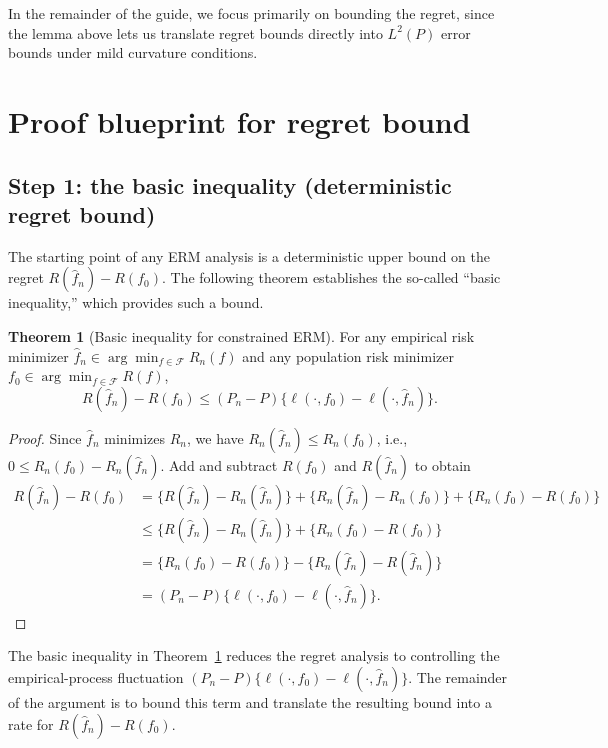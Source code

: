 \documentclass[11pt]{article}
\theoremstyle{plain}
\theoremstyle{definition} %
\newtheorem{theorem}{Theorem}
\begin{document}
In the remainder of the guide, we focus primarily on bounding the regret, since the lemma above lets us translate regret bounds directly into \(L^2(P)\) error bounds under mild curvature conditions.


\section{Proof blueprint for regret bound}

\label{sec:overview}





\subsection{Step 1: the basic inequality (deterministic regret bound)}

The starting point of any ERM analysis is a deterministic upper bound on the
regret \(R(\hat f_n)-R(f_0)\). The following theorem establishes the so-called
``basic inequality,'' which provides such a bound.   




\begin{theorem}[Basic inequality for constrained ERM]
\label{theorem::basic}
For any empirical risk minimizer $\hat f_n\in\arg\min_{f\in\mathcal F} R_n(f)$ and any population risk minimizer $f_0\in\arg\min_{f\in\mathcal F} R(f)$,
\[
R(\hat f_n)-R(f_0) \le (P_n-P)\bigl\{\ell(\cdot,f_0)-\ell(\cdot,\hat f_n)\bigr\}.
\]
\end{theorem}
\begin{proof}
Since $\hat f_n$ minimizes $R_n$, we have $R_n(\hat f_n)\le R_n(f_0)$, i.e.,
$0\le R_n(f_0)-R_n(\hat f_n)$. Add and subtract $R(f_0)$ and $R(\hat f_n)$ to obtain
\begin{align*}
R(\hat f_n)-R(f_0)
&= \bigl\{R(\hat f_n)-R_n(\hat f_n)\bigr\} + \bigl\{R_n(\hat f_n)-R_n(f_0)\bigr\} + \bigl\{R_n(f_0)-R(f_0)\bigr\} \\
&\le \bigl\{R(\hat f_n)-R_n(\hat f_n)\bigr\} + \bigl\{R_n(f_0)-R(f_0)\bigr\}\\
&= \bigl\{R_n(f_0)-R(f_0)\bigr\}-\bigl\{R_n(\hat f_n)-R(\hat f_n)\bigr\}\\
&= (P_n-P)\bigl\{\ell(\cdot,f_0)-\ell(\cdot,\hat f_n)\bigr\}.
\end{align*}
\end{proof}


The basic inequality in Theorem~\ref{theorem::basic} reduces the regret
analysis to controlling the empirical-process fluctuation
\((P_n-P)\{\ell(\cdot,f_0)-\ell(\cdot,\hat f_n)\}\). The remainder of the
argument is to bound this term and translate the resulting bound into a rate
for \(R(\hat f_n)-R(f_0)\).
\end{document}
